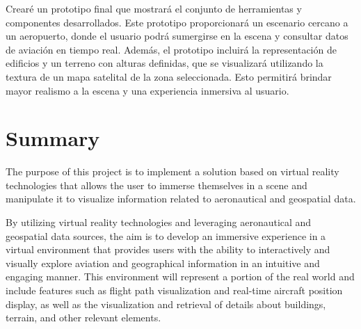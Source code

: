 \documentclass[a4paper, 11pt]{book}
\begin{document}
Crearé un prototipo final que mostrará el conjunto de herramientas y componentes desarrollados. Este prototipo proporcionará un escenario cercano a un aeropuerto, donde el usuario podrá sumergirse en la escena y consultar datos de aviación en tiempo real. Además, el prototipo incluirá la representación de edificios y un terreno con alturas definidas, que se visualizará utilizando la textura de un mapa satelital de la zona seleccionada. Esto permitirá brindar mayor realismo a la escena y una experiencia inmersiva al usuario.


\chapter*{Summary}

The purpose of this project is to implement a solution based on virtual reality technologies that allows the user to immerse themselves in a scene and manipulate it to visualize information related to aeronautical and geospatial data.

By utilizing virtual reality technologies and leveraging aeronautical and geospatial data sources, the aim is to develop an immersive experience in a virtual environment that provides users with the ability to interactively and visually explore aviation and geographical information in an intuitive and engaging manner. This environment will represent a portion of the real world and include features such as flight path visualization and real-time aircraft position display, as well as the visualization and retrieval of details about buildings, terrain, and other relevant elements.




\tableofcontents 
\cleardoublepage
\listoffigures %
\end{document}
